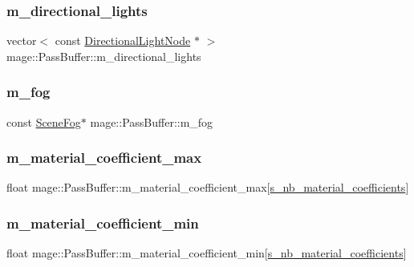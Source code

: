 \subsubsection{\texorpdfstring{m\+\_\+directional\+\_\+lights}{m\_directional\_lights}}
{\footnotesize\ttfamily vector$<$ const \hyperlink{namespacemage_a7637b5351fc0f66a10badd80ebb35899}{Directional\+Light\+Node} $\ast$ $>$ mage\+::\+Pass\+Buffer\+::m\+\_\+directional\+\_\+lights}

\hypertarget{structmage_1_1_pass_buffer_a3691cc52fe3bc5f1c86bf0dad36061d8}{}\label{structmage_1_1_pass_buffer_a3691cc52fe3bc5f1c86bf0dad36061d8} 
\subsubsection{\texorpdfstring{m\+\_\+fog}{m\_fog}}
{\footnotesize\ttfamily const \hyperlink{structmage_1_1_scene_fog}{Scene\+Fog}$\ast$ mage\+::\+Pass\+Buffer\+::m\+\_\+fog}

\hypertarget{structmage_1_1_pass_buffer_a09d2320b5536a9431d0c12be342d7695}{}\label{structmage_1_1_pass_buffer_a09d2320b5536a9431d0c12be342d7695} 
\subsubsection{\texorpdfstring{m\+\_\+material\+\_\+coefficient\+\_\+max}{m\_material\_coefficient\_max}}
{\footnotesize\ttfamily float mage\+::\+Pass\+Buffer\+::m\+\_\+material\+\_\+coefficient\+\_\+max\mbox{[}\hyperlink{structmage_1_1_pass_buffer_a51bba369e8114e3e60651e65579f8324}{s\+\_\+nb\+\_\+material\+\_\+coefficients}\mbox{]}}

\hypertarget{structmage_1_1_pass_buffer_a29b82f045d8559deeb1473b2c37d7449}{}\label{structmage_1_1_pass_buffer_a29b82f045d8559deeb1473b2c37d7449} 
\subsubsection{\texorpdfstring{m\+\_\+material\+\_\+coefficient\+\_\+min}{m\_material\_coefficient\_min}}
{\footnotesize\ttfamily float mage\+::\+Pass\+Buffer\+::m\+\_\+material\+\_\+coefficient\+\_\+min\mbox{[}\hyperlink{structmage_1_1_pass_buffer_a51bba369e8114e3e60651e65579f8324}{s\+\_\+nb\+\_\+material\+\_\+coefficients}\mbox{]}}

